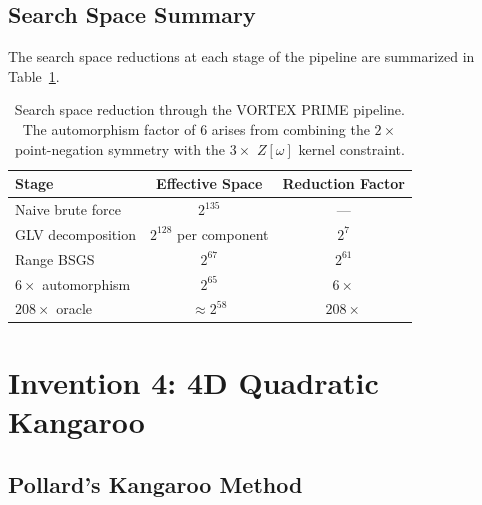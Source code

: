\documentclass[11pt,a4paper]{article}
\theoremstyle{definition}
\begin{document}
\subsection{Search Space Summary}

The search space reductions at each stage of the pipeline are summarized in Table~\ref{tab:search-space}.

\begin{table}[htbp]
  \centering
  \begin{tabular}{@{}lcc@{}}
    \toprule
    \textbf{Stage} & \textbf{Effective Space} & \textbf{Reduction Factor} \\
    \midrule
    Naive brute force & $2^{135}$ & --- \\
    GLV decomposition & $2^{128}$ per component & $2^7$ \\
    Range BSGS & $2^{67}$ & $2^{61}$ \\
    $6\times$ automorphism & $2^{65}$ & $6\times$ \\
    $208\times$ oracle & $\approx 2^{58}$ & $208\times$ \\
    \bottomrule
  \end{tabular}
  \caption{Search space reduction through the VORTEX PRIME pipeline. The automorphism factor of $6$ arises from combining the $2\times$ point-negation symmetry with the $3\times$ $Z[\omega]$ kernel constraint.}
  \label{tab:search-space}
\end{table}

\section{Invention 4: 4D Quadratic Kangaroo}

\subsection{Pollard's Kangaroo Method}
\end{document}
